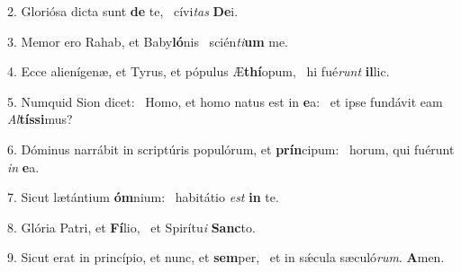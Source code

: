 2. Gloriósa dicta sunt \textbf{de} te, \ast\  cívi\textit{tas} \textbf{De}i.\

3. Memor ero Rahab, et Baby\textbf{ló}nis \ast\  scién\textit{ti}\textbf{um} me.\

4. Ecce alienígenæ, et Tyrus, et pópulus Æ\textbf{thí}opum, \ast\  hi fué\textit{runt} \textbf{il}lic.\

5. Numquid Sion dicet: \dag\  Homo, et homo natus est in \textbf{e}a: \ast\  et ipse fundávit eam \textit{Al}\textbf{tís}\textbf{si}mus?\

6. Dóminus narrábit in scriptúris populórum, et \textbf{prín}cipum: \ast\  horum, qui fuérunt \textit{in} \textbf{e}a.\

7. Sicut lætántium \textbf{óm}nium: \ast\  habitátio \textit{est} \textbf{in} te.\

8. Glória Patri, et \textbf{Fí}lio, \ast\  et Spirítu\textit{i} \textbf{Sanc}to.\

9. Sicut erat in princípio, et nunc, et \textbf{sem}per, \ast\  et in sǽcula sæculó\textit{rum}. \textbf{A}men.\

